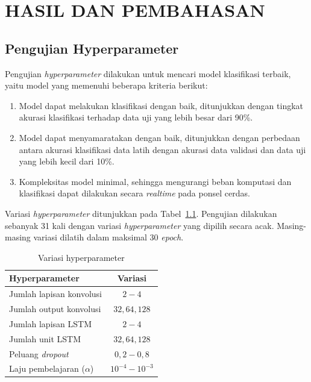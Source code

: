 \chapter{HASIL DAN PEMBAHASAN}

\section{Pengujian Hyperparameter}

Pengujian \textit{hyperparameter} dilakukan untuk mencari model klasifikasi terbaik, yaitu model yang memenuhi beberapa kriteria berikut:

\begin{enumerate}
    \item Model dapat melakukan klasifikasi dengan baik, ditunjukkan dengan tingkat akurasi klasifikasi terhadap data uji yang lebih besar dari 90\%.
    \item Model dapat menyamaratakan dengan baik, ditunjukkan dengan perbedaan antara akurasi klasifikasi data latih dengan akurasi data validasi dan data uji yang lebih kecil dari 10\%.
    \item Kompleksitas model minimal, sehingga mengurangi beban komputasi dan klasifikasi dapat dilakukan secara \textit{realtime} pada ponsel cerdas.
\end{enumerate}

Variasi \textit{hyperparameter} ditunjukkan pada Tabel~\ref{table:variasi-hyperparameter}. Pengujian dilakukan sebanyak 31 kali dengan variasi \textit{hyperparameter} yang dipilih secara acak. Masing-masing variasi dilatih dalam maksimal 30 \textit{epoch}.

\begin{table}[h!]
    \centering
    \caption{Variasi hyperparameter}
    \begin{tabular}{ |l|c| }
        \hline
        Hyperparameter & Variasi \\

        \hline
        Jumlah lapisan konvolusi & $2 - 4$ \\

        \hline
        Jumlah output konvolusi & $32, 64, 128$ \\

        \hline
        Jumlah lapisan LSTM & $2 - 4$ \\

        \hline
        Jumlah unit LSTM & $32, 64, 128$ \\

        \hline
        Peluang \textit{dropout} & $0,2 - 0,8$ \\

        \hline
        Laju pembelajaran ($\alpha$) & $10^{-4} - 10^{-3}$ \\

        \hline
    \end{tabular}
    \label{table:variasi-hyperparameter}
\end{table}

